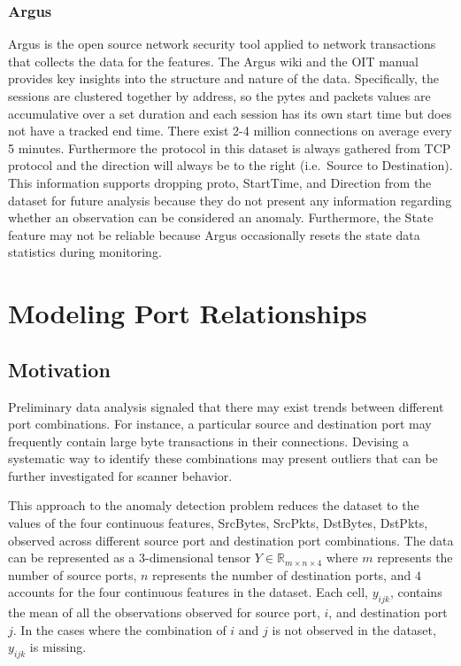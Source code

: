 \documentclass[12pt,twoside]{dukestatscithesis}
\theoremstyle{definition}
\theoremstyle{definition}
\theoremstyle{definition}
\theoremstyle{remark}
\begin{document}
\subsection{Argus}\label{argus}

Argus is the open source network security tool applied to network
transactions that collects the data for the features. The Argus wiki and
the OIT manual provides key insights into the structure and nature of
the data. Specifically, the sessions are clustered together by address,
so the pytes and packets values are accumulative over a set duration and
each session has its own start time but does not have a tracked end
time. There exist 2-4 million connections on average every 5 minutes.
Furthermore the protocol in this dataset is always gathered from TCP
protocol and the direction will always be to the right (i.e.~Source to
Destination). This information supports dropping proto, StartTime, and
Direction from the dataset for future analysis because they do not
present any information regarding whether an observation can be
considered an anomaly. Furthermore, the State feature may not be
reliable because Argus occasionally resets the state data statistics
during monitoring.

\chapter{Modeling Port Relationships}\label{modeling-port-relationships}

\section{Motivation}\label{motivation}

Preliminary data analysis signaled that there may exist trends between
different port combinations. For instance, a particular source and
destination port may frequently contain large byte transactions in their
connections. Devising a systematic way to identify these combinations
may present outliers that can be further investigated for scanner
behavior.

This approach to the anomaly detection problem reduces the dataset to
the values of the four continuous features, SrcBytes, SrcPkts, DstBytes,
DstPkts, observed across different source port and destination port
combinations. The data can be represented as a 3-dimensional tensor
\(Y \in \mathbb{R}_{m \times n \times 4}\) where \(m\) represents the
number of source ports, \(n\) represents the number of destination
ports, and \(4\) accounts for the four continuous features in the
dataset. Each cell, \(y_{ijk}\), contains the mean of all the
observations observed for source port, \(i\), and destination port
\(j\). In the cases where the combination of \(i\) and \(j\) is not
observed in the dataset, \(y_{ijk}\) is missing.
\end{document}
